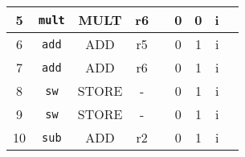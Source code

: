 \begin{ejercicio}
\begin{center}
\begin{tabular}{|c|c|c|c|c|c|c|c|c|}
            5  & \verb|mult|& MULT   & r6      &       & 0      & 0      & i     \\ \hline
            6  & \verb|add| & ADD    & r5      &       & 0      & 1      & i     \\ \hline
            7  & \verb|add| & ADD    & r6      &       & 0      & 1      & i     \\ \hline
            8  & \verb|sw|  & STORE  & -       &       & 0      & 1      & i     \\ \hline
            9  & \verb|sw|  & STORE  & -       &       & 0      & 1      & i     \\ \hline
            10 & \verb|sub| & ADD    & r2      &       & 0      & 1      & i     \\ \hline
        \end{tabular}
        \end{center}


\end{ejercicio}
